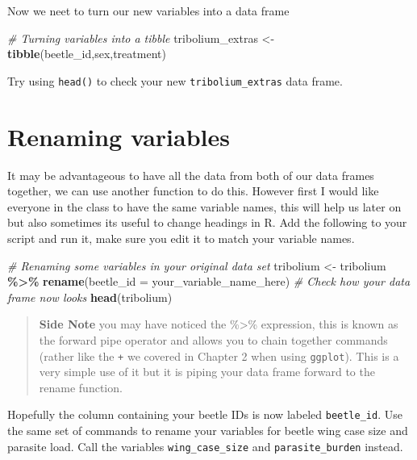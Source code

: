 \documentclass[
]{book}
\newenvironment{Shaded}{\begin{snugshade}}{\end{snugshade}}
\newcommand{\AttributeTok}[1]{\textcolor[rgb]{0.13,0.29,0.53}{#1}}
\newcommand{\CommentTok}[1]{\textcolor[rgb]{0.56,0.35,0.01}{\textit{#1}}}
\newcommand{\FunctionTok}[1]{\textcolor[rgb]{0.13,0.29,0.53}{\textbf{#1}}}
\newcommand{\NormalTok}[1]{#1}
\newcommand{\OtherTok}[1]{\textcolor[rgb]{0.56,0.35,0.01}{#1}}
\newcommand{\SpecialCharTok}[1]{\textcolor[rgb]{0.81,0.36,0.00}{\textbf{#1}}}
\begin{document}
Now we neet to turn our new variables into a data frame

\begin{Shaded}
\begin{Highlighting}[]
\CommentTok{\# Turning variables into a tibble}
\NormalTok{tribolium\_extras }\OtherTok{\textless{}{-}} \FunctionTok{tibble}\NormalTok{(beetle\_id,sex,treatment)}
\end{Highlighting}
\end{Shaded}

Try using \texttt{head()} to check your new \texttt{tribolium\_extras} data frame.

\section{Renaming variables}\label{renaming}

It may be advantageous to have all the data from both of our data frames together, we can use another function to do this. However first I would like everyone in the class to have the same variable names, this will help us later on but also sometimes its useful to change headings in R. Add the following to your script and run it, make sure you edit it to match your variable names.

\begin{Shaded}
\begin{Highlighting}[]
\CommentTok{\# Renaming some variables in your original data set}
\NormalTok{tribolium }\OtherTok{\textless{}{-}}\NormalTok{ tribolium }\SpecialCharTok{\%\textgreater{}\%}
  \FunctionTok{rename}\NormalTok{(}\AttributeTok{beetle\_id =}\NormalTok{ your\_variable\_name\_here)}
\CommentTok{\# Check how your data frame now looks}
\FunctionTok{head}\NormalTok{(tribolium) }
\end{Highlighting}
\end{Shaded}

\begin{quote}
\textbf{Side Note} you may have noticed the \%\textgreater\% expression, this is known as the forward pipe operator and allows you to chain together commands (rather like the \texttt{+} we covered in Chapter 2 when using \texttt{ggplot}). This is a very simple use of it but it is piping your data frame forward to the rename function.
\end{quote}

Hopefully the column containing your beetle IDs is now labeled \texttt{beetle\_id}. Use the same set of commands to rename your variables for beetle wing case size and parasite load. Call the variables \texttt{wing\_case\_size} and \texttt{parasite\_burden} instead.
\end{document}
